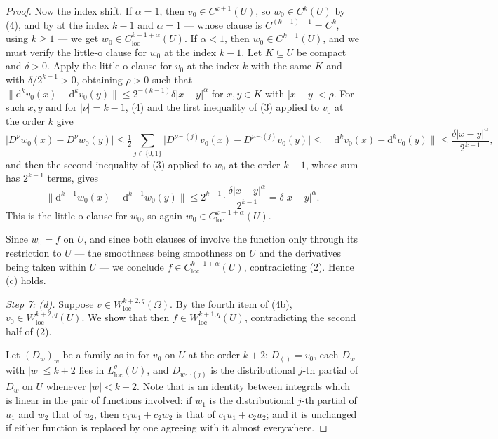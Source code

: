 \begin{proof}
Now the index shift.  If $\alpha=1$, then $v_0\in C^{k+1}(U)$, so
$w_0\in C^{k}(U)$ by (4), and by  at the index $k-1$
and $\alpha=1$ --- whose clause is $C^{(k-1)+1}=C^{k}$, using $k\ge1$ --- we get
$w_0\in C^{k-1+\alpha}_{\mathrm{loc}}(U)$.  If $\alpha<1$, then
$w_0\in C^{k-1}(U)$, and we must verify the little-o clause for $w_0$ at the
index $k-1$.  Let $K\subseteq U$ be compact and $\delta>0$.  Apply the little-o
clause for $v_0$ at the index $k$ with the same $K$ and with
$\delta/2^{k-1}>0$, obtaining $\rho>0$ such that
$\|\mathrm{d}^{k}v_0(x)-\mathrm{d}^{k}v_0(y)\|\le2^{-(k-1)}\delta|x-y|^{\alpha}$
for $x,y\in K$ with $|x-y|<\rho$.  For such $x,y$ and for $|\nu|=k-1$, (4) and
the first inequality of (3) applied to $v_0$ at the order $k$ give
\[
  \bigl|D^\nu w_0(x)-D^\nu w_0(y)\bigr|
  \le\tfrac12\sum_{j\in\{0,1\}}
    \bigl|D^{\nu\frown(j)}v_0(x)-D^{\nu\frown(j)}v_0(y)\bigr|
  \le\bigl\|\mathrm{d}^{k}v_0(x)-\mathrm{d}^{k}v_0(y)\bigr\|
  \le\frac{\delta|x-y|^{\alpha}}{2^{k-1}} ,
\]
and then the second inequality of (3) applied to $w_0$ at the order $k-1$,
whose sum has $2^{k-1}$ terms, gives
\[
  \bigl\|\mathrm{d}^{k-1}w_0(x)-\mathrm{d}^{k-1}w_0(y)\bigr\|
  \le2^{k-1}\cdot\frac{\delta|x-y|^{\alpha}}{2^{k-1}}
  =\delta|x-y|^{\alpha}.
\]
This is the little-o clause for $w_0$, so again
$w_0\in C^{k-1+\alpha}_{\mathrm{loc}}(U)$.

Since $w_0=f$ on $U$, and since both clauses of 
involve the function only through its restriction to $U$ --- the smoothness
being smoothness on $U$ and the derivatives being taken within $U$ --- we
conclude $f\in C^{k-1+\alpha}_{\mathrm{loc}}(U)$, contradicting (2).
Hence (c) holds.

\emph{Step 7: (d).}  Suppose $v\in W^{k+2,q}_{\mathrm{loc}}(\Omega)$.  By the
fourth item of (4b), $v_0\in W^{k+2,q}_{\mathrm{loc}}(U)$.  We show that then
$f\in W^{k+1,q}_{\mathrm{loc}}(U)$, contradicting the second half of (2).

Let $(D_w)_w$ be a family as in  for $v_0$ on $U$ at the
order $k+2$: $D_{()}=v_0$, each $D_w$ with $|w|\le k+2$ lies in
$L^{q}_{\mathrm{loc}}(U)$, and $D_{w\frown(j)}$ is the distributional $j$-th
partial of $D_w$ on $U$ whenever $|w|<k+2$.  Note that
 is an identity between integrals which is linear in
the pair of functions involved: if $w_1$ is the distributional $j$-th partial of
$u_1$ and $w_2$ that of $u_2$, then $c_1w_1+c_2w_2$ is that of
$c_1u_1+c_2u_2$; and it is unchanged if either function is replaced by one
agreeing with it almost everywhere.


\end{proof}
